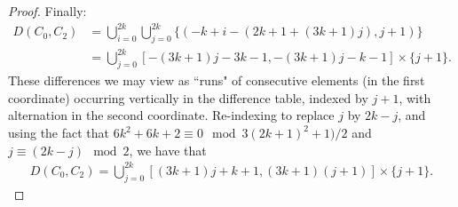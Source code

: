 \documentclass[10pt,a4paper]{amsart}
\begin{document}
\begin{proof}
Finally:
\begin{align*}
D(C_0,C_2) &=\bigcup_{i=0}^{2k}\bigcup_{j=0}^{2k}\{(-k+i-(2k+1+(3k+1)j),j+1)\}\\
&=\bigcup_{j=0}^{2k}[-(3k+1)j-3k-1,-(3k+1)j-k-1]\times\{j+1\}.
\end{align*}
These differences we may view as ``runs" of consecutive elements (in the first coordinate) occurring vertically in the difference table, indexed by $j+1$, with alternation in the second coordinate. Re-indexing to replace $j$ by $2k-j$, and using the fact that $6k^2+6k+2 \equiv 0 \mod 3(2k + 1)^2 + 1)/2$ and $j \equiv (2k-j) \mod 2$, we have that
\begin{align*}
D(C_0,C_2)=\bigcup_{j=0}^{2k}[(3k+1)j+k+1,(3k+1)(j+1)]\times\{j+1\}.
\end{align*}


\end{proof}
\end{document}
